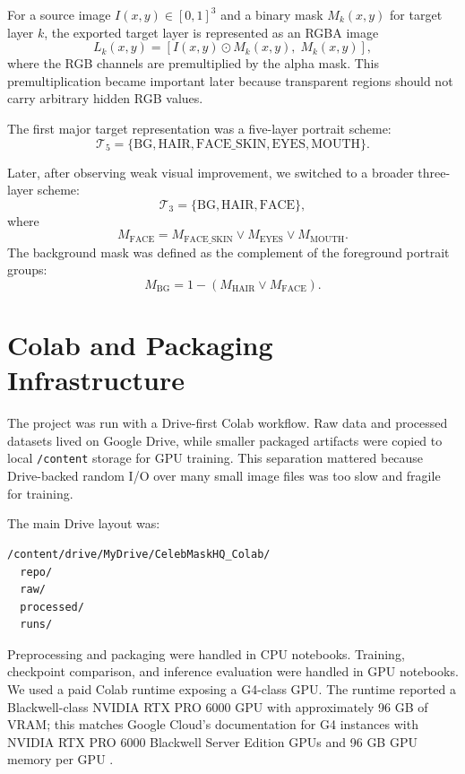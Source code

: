 \documentclass[11pt]{article}
\begin{document}
For a source image $I(x,y)\in[0,1]^3$ and a binary mask $M_k(x,y)$ for target
layer $k$, the exported target layer is represented as an RGBA image
\begin{equation}
L_k(x,y)=
\left[
I(x,y)\odot M_k(x,y),\;
M_k(x,y)
\right],
\end{equation}
where the RGB channels are premultiplied by the alpha mask. This premultiplication
became important later because transparent regions should not carry arbitrary
hidden RGB values.

The first major target representation was a five-layer portrait scheme:
\begin{equation}
\mathcal{T}_5=
\{\mathrm{BG},\mathrm{HAIR},\mathrm{FACE\_SKIN},\mathrm{EYES},\mathrm{MOUTH}\}.
\end{equation}

Later, after observing weak visual improvement, we switched to a broader
three-layer scheme:
\begin{equation}
\mathcal{T}_3=
\{\mathrm{BG},\mathrm{HAIR},\mathrm{FACE}\},
\end{equation}
where
\begin{equation}
M_{\mathrm{FACE}}
=
M_{\mathrm{FACE\_SKIN}}
\lor
M_{\mathrm{EYES}}
\lor
M_{\mathrm{MOUTH}}.
\end{equation}
The background mask was defined as the complement of the foreground portrait
groups:
\begin{equation}
M_{\mathrm{BG}}
=
1-
\left(M_{\mathrm{HAIR}}\lor M_{\mathrm{FACE}}\right).
\end{equation}

\section{Colab and Packaging Infrastructure}

The project was run with a Drive-first Colab workflow. Raw data and processed
datasets lived on Google Drive, while smaller packaged artifacts were copied to
local \texttt{/content} storage for GPU training. This separation mattered because
Drive-backed random I/O over many small image files was too slow and fragile for
training.

The main Drive layout was:

\begin{verbatim}
/content/drive/MyDrive/CelebMaskHQ_Colab/
  repo/
  raw/
  processed/
  runs/
\end{verbatim}

Preprocessing and packaging were handled in CPU notebooks. Training, checkpoint
comparison, and inference evaluation were handled in GPU notebooks. We used a
paid Colab runtime exposing a G4-class GPU. The runtime reported a Blackwell-class
NVIDIA RTX PRO 6000 GPU with approximately 96 GB of VRAM; this matches Google
Cloud's documentation for G4 instances with NVIDIA RTX PRO 6000 Blackwell Server
Edition GPUs and 96 GB GPU memory per GPU \cite{googleg4}.
\end{document}
